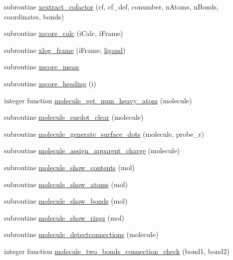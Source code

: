 \begin{DoxyCompactItemize}
subroutine \hyperlink{classcalc__xscore_aa0277efb6695094d02cdfdfcf07d0f94}{xextract\-\_\-cofactor} (cf, cf\-\_\-def, conumber, n\-Atoms, n\-Bonds, coordinates, bonds)
\item 
subroutine \hyperlink{classcalc__xscore_a1f2c852d7a1ed801d7b14ce6205a384e}{xscore\-\_\-calc} (i\-Calc, i\-Frame)
\item 
subroutine \hyperlink{classcalc__xscore_ade4f69793fb095b25738ca6027240398}{xlog\-\_\-frame} (i\-Frame, \hyperlink{classcalc__xscore_ad2efc1238a463be4b83681419cd6b113}{ligand})
\item 
subroutine \hyperlink{classcalc__xscore_a9f44d606adb68d2cfa8ada438d0580bd}{xscore\-\_\-mean}
\item 
subroutine \hyperlink{classcalc__xscore_a0b752f2d11da627f5a032e559c2be351}{xscore\-\_\-heading} (i)
\item 
integer function \hyperlink{classcalc__xscore_aeb1eda7dbfa9a1b8e1a81060a5ee02b7}{molecule\-\_\-get\-\_\-num\-\_\-heavy\-\_\-atom} (molecule)
\item 
subroutine \hyperlink{classcalc__xscore_a8cd8633f01640ca14a97332ae11d0f5c}{molecule\-\_\-surdot\-\_\-clear} (molecule)
\item 
subroutine \hyperlink{classcalc__xscore_a3a384f1b62ccb01b1b379a50deeaff5b}{molecule\-\_\-generate\-\_\-surface\-\_\-dots} (molecule, probe\-\_\-r)
\item 
subroutine \hyperlink{classcalc__xscore_aa8f748ccf69b93328b39caa8d0f49e1a}{molecule\-\_\-assign\-\_\-apparent\-\_\-charge} (molecule)
\item 
subroutine \hyperlink{classcalc__xscore_ab91a32d9f1f50f9685139e1dd01657d1}{molecule\-\_\-show\-\_\-contents} (mol)
\item 
subroutine \hyperlink{classcalc__xscore_ac0d605722ea0652ff5fd96530a950378}{molecule\-\_\-show\-\_\-atoms} (mol)
\item 
subroutine \hyperlink{classcalc__xscore_aa9b25d3ef95ca8a51168910e65c3fd9a}{molecule\-\_\-show\-\_\-bonds} (mol)
\item 
subroutine \hyperlink{classcalc__xscore_a002b3884a4fa785e923e4e1dafa1b98c}{molecule\-\_\-show\-\_\-rings} (mol)
\item 
subroutine \hyperlink{classcalc__xscore_aa6e7c39e5e5508351480762ce22d6001}{molecule\-\_\-detectconnections} (molecule)
\item 
integer function \hyperlink{classcalc__xscore_a17318018eb24d9905711f7408ae387d0}{molecule\-\_\-two\-\_\-bonds\-\_\-connection\-\_\-check} (bond1, bond2)
\item 

\end{DoxyCompactItemize}
